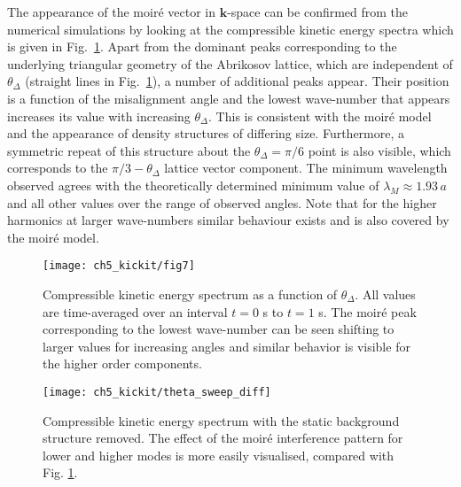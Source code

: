     The appearance of the moir\'e vector in $\mathbf{k}$-space can be confirmed from the numerical simulations by looking at the compressible kinetic energy spectra which is given in Fig.~\ref{fig:dtheta_kspec}. Apart from the dominant peaks corresponding to the underlying triangular geometry of the Abrikosov lattice, which are independent of $\theta_\Delta$ (straight lines in Fig.~\ref{fig:dtheta_kspec}), a number of additional peaks appear. Their position is a function of the misalignment angle and the lowest wave-number that appears increases its value with increasing $\theta_\Delta$. This is consistent with the moir\'e model and the appearance of density structures of differing size. Furthermore, a symmetric repeat of this structure about the $\theta_\Delta=\pi/6$ point is also visible, which corresponds to the $\pi/3 - \theta_\Delta$ lattice vector component. The minimum wavelength observed agrees with the theoretically determined minimum value of $\lambda_M\approx 1.93\,a$ and all other values over the range of observed angles. Note that for the higher harmonics at larger wave-numbers similar behaviour exists and is also covered by the moir\'e model.
	\begin{figure}[tb]
        \centering
		\texttt{[image: ch5\_kickit/fig7]}
		\caption[Compressible kinetic energy spectrum as a function of $\theta_\Delta$.]{Compressible kinetic energy spectrum as a function of $\theta_\Delta$. All values are time-averaged over an interval $t=0$ s to $t=1$ s. The moir\'e peak corresponding to the lowest wave-number can be seen shifting to larger values for increasing angles and similar behavior is visible for the higher order components.}
		\label{fig:dtheta_kspec}
	\end{figure}
    \begin{figure}[tb]
        \centering
        \texttt{[image: ch5\_kickit/theta\_sweep\_diff]}
        \caption[Compressible kinetic energy spectrum with the background structure removed.]{Compressible kinetic energy spectrum with the static background structure removed. The effect of the moir\'e interference pattern for lower and higher modes is more easily visualised, compared with Fig. \ref{fig:dtheta_kspec}.}
        \label{fig:dtheta_kspec_backg}
    \end{figure}

